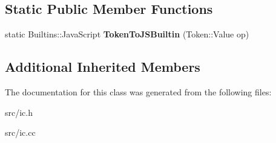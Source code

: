 \subsection*{Static Public Member Functions}
\begin{DoxyCompactItemize}
\item 
\hypertarget{classv8_1_1internal_1_1_binary_op_i_c_aa2895299ae163dc441fa63eb8aa44b10}{}static Builtins\+::\+Java\+Script {\bfseries Token\+To\+J\+S\+Builtin} (Token\+::\+Value op)\label{classv8_1_1internal_1_1_binary_op_i_c_aa2895299ae163dc441fa63eb8aa44b10}

\end{DoxyCompactItemize}
\subsection*{Additional Inherited Members}


The documentation for this class was generated from the following files\+:\begin{DoxyCompactItemize}
\item 
src/ic.\+h\item 
src/ic.\+cc\end{DoxyCompactItemize}
